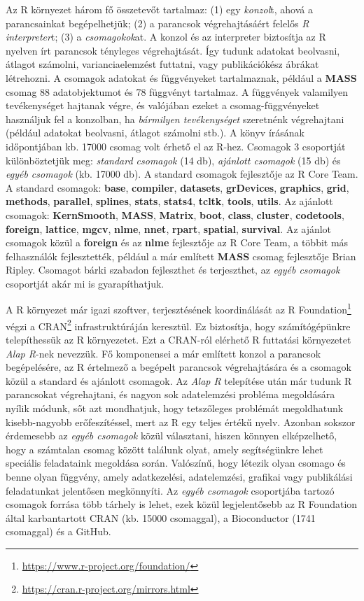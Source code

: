 \documentclass[
]{book}
\DeclareRobustCommand{\href}[2]{#2\footnote{\url{#1}}}
\begin{document}
Az R környezet három fő összetevőt tartalmaz: (1) egy \emph{konzol}t, ahová a parancsainkat begépelhetjük; (2) a parancsok végrehajtásáért felelős \emph{R interpreter}t; (3) a \emph{csomagokok}at. A konzol és az interpreter biztosítja az R nyelven írt parancsok tényleges végrehajtását. Így tudunk adatokat beolvasni, átlagot számolni, varianciaelemzést futtatni, vagy publikációkész ábrákat létrehozni. A csomagok adatokat és függvényeket tartalmaznak, például a \textbf{MASS} csomag 88 adatobjektumot és 78 függvényt tartalmaz. A függvények valamilyen tevékenységet hajtanak végre, és valójában ezeket a csomag-függvényeket használjuk fel a konzolban, ha \emph{bármilyen tevékenységet} szeretnénk végrehajtani (például adatokat beolvasni, átlagot számolni stb.). A könyv írásának időpontjában kb. 17000 csomag volt érhető el az R-hez. Csomagok 3 csoportját különböztetjük meg: \emph{standard csomagok} (14 db), \emph{ajánlott csomagok} (15 db) és \emph{egyéb csomagok} (kb. 17000 db). A standard csomagok fejlesztője az R Core Team. A standard csomagok: \textbf{base}, \textbf{compiler}, \textbf{datasets}, \textbf{grDevices}, \textbf{graphics}, \textbf{grid}, \textbf{methods}, \textbf{parallel}, \textbf{splines}, \textbf{stats}, \textbf{stats4}, \textbf{tcltk}, \textbf{tools}, \textbf{utils}. Az ajánlott csomagok: \textbf{KernSmooth}, \textbf{MASS}, \textbf{Matrix}, \textbf{boot}, \textbf{class}, \textbf{cluster}, \textbf{codetools}, \textbf{foreign}, \textbf{lattice}, \textbf{mgcv}, \textbf{nlme}, \textbf{nnet}, \textbf{rpart}, \textbf{spatial}, \textbf{survival}. Az ajánlot csomagok közül a \textbf{foreign} és az \textbf{nlme} fejlesztője az R Core Team, a többit más felhasználók fejlesztették, például a már említett \textbf{MASS} csomag fejlesztője Brian Ripley. Csomagot bárki szabadon fejleszthet és terjeszthet, az \emph{egyéb csomagok} csoportját akár mi is gyarapíthatjuk.

A R környezet már igazi szoftver, terjesztésének koordinálását az \href{https://www.r-project.org/foundation/}{R Foundation} végzi a \href{https://cran.r-project.org/mirrors.html}{CRAN} infrastruktúráján keresztül. Ez biztosítja, hogy számítógépünkre telepíthessük az R környezetet. Ezt a CRAN-ról elérhető R futtatási környezetet \emph{Alap R}-nek nevezzük. Fő komponensei a már említett konzol a parancsok begépelésére, az R értelmező a begépelt parancsok végrehajtására és a csomagok közül a standard és ajánlott csomagok. Az \emph{Alap R} telepítése után már tudunk R parancsokat végrehajtani, és nagyon sok adatelemzési probléma megoldására nyílik módunk, sőt azt mondhatjuk, hogy tetszőleges problémát megoldhatunk kisebb-nagyobb erőfeszítéssel, mert az R egy teljes értékű nyelv. Azonban sokszor érdemesebb az \emph{egyéb csomagok} közül választani, hiszen könnyen elképzelhető, hogy a számtalan csomag között találunk olyat, amely segítségünkre lehet speciális feladataink megoldása során. Valószínű, hogy létezik olyan csomago és benne olyan függvény, amely adatkezelési, adatelemzési, grafikai vagy publikálási feladatunkat jelentősen megkönnyíti. Az \emph{egyéb csomagok} csoportjába tartozó csomagok forrása több tárhely is lehet, ezek közül legjelentősebb az R Foundation által karbantartott CRAN (kb. 15000 csomaggal), a Bioconductor (1741 csomaggal) és a GitHub.
\end{document}
